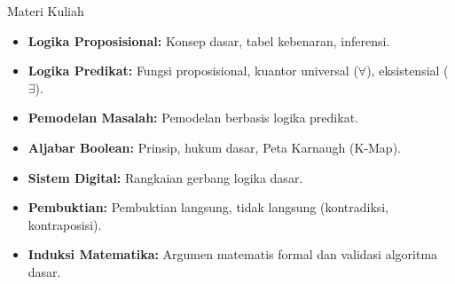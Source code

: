 \documentclass[handout]{beamer}
\begin{document}

	\begin{frame}{Materi Kuliah}
		\begin{itemize}
			\item \textbf{Logika Proposisional:} Konsep dasar, tabel kebenaran, inferensi.
			\item \textbf{Logika Predikat:} Fungsi proposisional, kuantor universal ($\forall$), eksistensial ($\exists$).
			\item \textbf{Pemodelan Masalah:} Pemodelan berbasis logika predikat.
			\item \textbf{Aljabar Boolean:} Prinsip, hukum dasar, Peta Karnaugh (K-Map).
			\item \textbf{Sistem Digital:} Rangkaian gerbang logika dasar.
			\item \textbf{Pembuktian:} Pembuktian langsung, tidak langsung (kontradiksi, kontraposisi).
			\item \textbf{Induksi Matematika:} Argumen matematis formal dan validasi algoritma dasar.
		\end{itemize}
	\end{frame}
	
\end{document}
